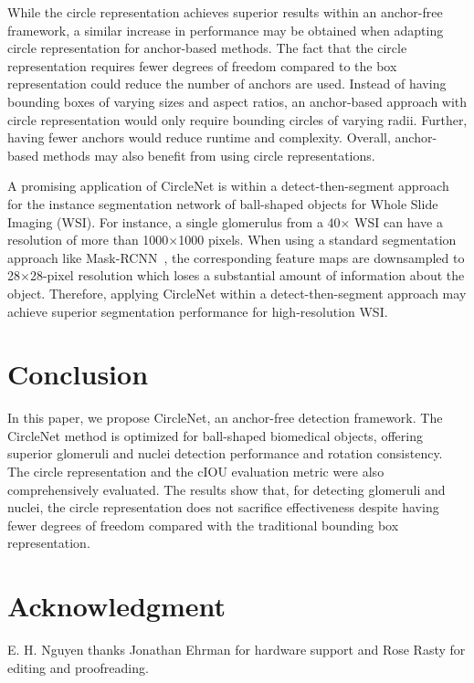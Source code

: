 \documentclass[journal]{IEEEtran}
\begin{document}
While the circle representation achieves superior results within an anchor-free framework, a similar increase in performance may be obtained when adapting circle representation for anchor-based methods. The fact that the circle representation requires fewer degrees of freedom compared to the box representation could reduce the number of anchors are used. Instead of having bounding boxes of varying sizes and aspect ratios, an anchor-based approach with circle representation would only require bounding circles of varying radii. Further, having fewer anchors would reduce runtime and complexity. Overall, anchor-based methods may also benefit from using circle representations.

A promising application of CircleNet is within a detect-then-segment approach for the instance segmentation network of ball-shaped objects for Whole Slide Imaging (WSI). For instance, a single glomerulus from a 40$\times$ WSI can have a resolution of more than 1000$\times$1000 pixels. When using a standard segmentation approach like Mask-RCNN~\cite{he2017mask}, the corresponding feature maps are downsampled to 28$\times$28-pixel resolution which loses a substantial amount of information about the object. Therefore, applying CircleNet within a detect-then-segment approach may achieve superior segmentation performance for high-resolution WSI.
\section{Conclusion}
In this paper, we propose CircleNet, an anchor-free detection framework. The CircleNet method is optimized for ball-shaped biomedical objects, offering superior glomeruli and nuclei detection performance and rotation consistency. The circle representation and the cIOU evaluation metric were also comprehensively evaluated. The results show that, for detecting glomeruli and nuclei, the circle representation does not sacrifice effectiveness despite having fewer degrees of freedom compared with the traditional bounding box representation.

\section*{Acknowledgment}
E. H. Nguyen thanks Jonathan Ehrman for hardware support and Rose Rasty for editing and proofreading.



\end{document}
